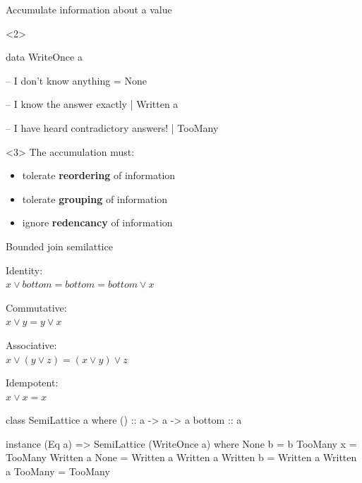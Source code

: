 \documentclass[UKenglish,usenames,dvipsnames,svgnames,table,aspectratio=169,mathserif]{beamer}
\newcommand{\nl}{\vspace{\baselineskip}}
\begin{document}
\begin{frame}[fragile]
\centering \huge
Accumulate information about a value
\nl

\large
\begin{overlayarea}{\textwidth}{0.5\textheight}
\begin{onlyenv}<2>

\begin{haskellcode}

data WriteOnce a

  -- I don't know anything
  = None

  -- I know the answer exactly
  | Written a

  -- I have heard contradictory answers!
  | TooMany
\end{haskellcode}
\end{onlyenv}
\begin{onlyenv}<3>
The accumulation must:

\begin{itemize}
\item tolerate {\bf reordering} of information
\item tolerate {\bf grouping} of information
\item ignore {\bf redencancy} of information
\end{itemize}
\end{onlyenv}
\end{overlayarea}
\end{frame}


\begin{frame}[fragile]
\centering \huge
Bounded join semilattice
\nl
\large

Identity: \\
$x \vee bottom = bottom = bottom \vee x$
\nl

Commutative: \\
$x \vee y = y \vee x$
\nl

Associative: \\
$x \vee (y \vee z) = (x \vee y) \vee z$
\nl

Idempotent: \\
$x \vee x = x$

\end{frame}


\begin{frame}[fragile]
\begin{haskellcode}
class SemiLattice a where
  (\/)   :: a -> a -> a
  bottom :: a

instance (Eq a) => SemiLattice (WriteOnce a) where
  None      \/ b           = b
  TooMany   \/ x           = TooMany
  Written a \/ None        = Written a
  Written a \/ Written b   = Written a
  Written a \/ TooMany     = TooMany
\end{haskellcode}
\end{frame}
\end{document}
